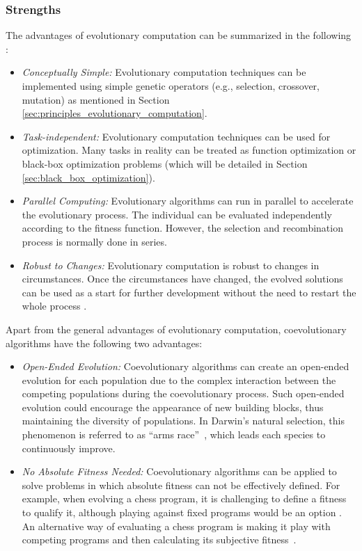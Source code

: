 \subsubsection{Strengths}

The advantages of evolutionary computation can be summarized in the following \cite{Fogel:1997}:

\begin{itemize}
\item \textit{Conceptually Simple:} Evolutionary computation techniques can be implemented using simple genetic operators (e.g., selection, crossover, mutation) as mentioned in Section \ref{sec:principles_evolutionary_computation}. 

\item \textit{Task-independent:} Evolutionary computation techniques can be used for optimization. Many tasks in reality can be treated as function optimization or black-box optimization problems (which will be detailed in Section \ref{sec:black_box_optimization}). 

\item \textit{Parallel Computing:} Evolutionary algorithms can run in parallel to accelerate the evolutionary process. The individual can be evaluated independently according to the fitness function. However, the selection and recombination process is normally done in series.

\item \textit{Robust to Changes:} Evolutionary computation is robust to changes in circumstances. Once the circumstances have changed, the evolved solutions can be used as a start for further development without the need to restart the whole process \cite{Hornby2011}.
 
\end{itemize}

Apart from the general advantages of evolutionary computation, coevolutionary algorithms have the following two advantages:

\begin{itemize}
\item \textit{Open-Ended Evolution:} Coevolutionary algorithms can create an open-ended evolution for each population due to the complex interaction between the competing populations during the coevolutionary process. Such open-ended evolution could encourage the appearance of new building blocks, thus maintaining the diversity of populations. In Darwin's natural selection, this phenomenon is referred to as ``arms race''~\cite{Dawkins_1979}, which leads each species to continuously improve.  

\item \textit{No Absolute Fitness Needed:} Coevolutionary algorithms can be applied to solve problems in which absolute fitness can not be effectively defined. For example, when evolving a chess program, it is challenging to define a fitness to qualify it, although playing against fixed programs would be an option \cite{gross2002evolving}. An alternative way of evaluating a chess program is making it play with competing programs and then calculating its subjective fitness~\cite{Angeline_1993, David2014}. 
\end{itemize}

